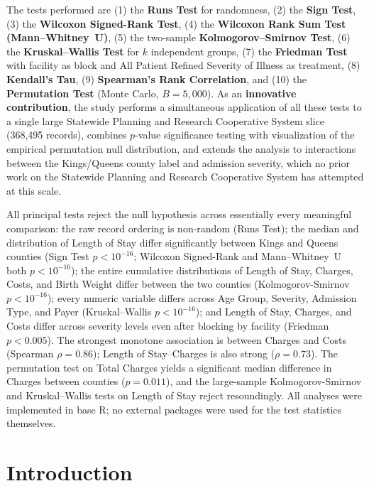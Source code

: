 \documentclass[12pt]{article}
\begin{document}
The tests performed are (1) the \textbf{Runs Test} for randomness,
(2) the \textbf{Sign Test}, (3) the \textbf{Wilcoxon Signed-Rank Test},
(4) the \textbf{Wilcoxon Rank Sum Test (Mann--Whitney~U)}, (5) the
two-sample \textbf{Kolmogorov--Smirnov Test}, (6) the
\textbf{Kruskal--Wallis Test} for $k$ independent groups, (7) the
\textbf{Friedman Test} with facility as block and All Patient Refined Severity of Illness
as treatment, (8) \textbf{Kendall's Tau}, (9) \textbf{Spearman's Rank
Correlation}, and (10) the \textbf{Permutation Test} (Monte Carlo,
$B=5{,}000$). As an \textbf{innovative contribution}, the study performs
a simultaneous application of all these tests to a single large Statewide Planning and Research Cooperative System
slice (368{,}495 records), combines $p$-value significance testing with
visualization of the empirical permutation null distribution, and extends
the analysis to interactions between the Kings/Queens county label and
admission severity, which no prior work on the Statewide Planning and Research Cooperative System has attempted at this
scale.

All principal tests reject the null hypothesis across essentially every
meaningful comparison: the raw record ordering is non-random (Runs Test);
the median and distribution of Length of Stay differ significantly
between Kings and Queens counties (Sign Test $p<10^{-16}$;
Wilcoxon Signed-Rank and Mann--Whitney~U both $p<10^{-16}$); the entire
cumulative distributions of Length of Stay, Charges, Costs, and Birth Weight differ
between the two counties (Kolmogorov-Smirnov $p<10^{-16}$); every numeric variable
differs across Age Group, Severity, Admission Type, and Payer
(Kruskal--Wallis $p<10^{-16}$); and Length of Stay, Charges, and Costs differ across
severity levels even after blocking by facility (Friedman $p<0.005$).
The strongest monotone association is between Charges and Costs
(Spearman $\rho=0.86$); Length of Stay--Charges is also strong ($\rho=0.73$).
The permutation test on Total Charges yields a significant median
difference in Charges between counties ($p=0.011$), and the
large-sample Kolmogorov-Smirnov and Kruskal--Wallis tests on Length
of Stay reject resoundingly. All analyses were implemented in base R;
no external packages were used for the test statistics themselves.

\section{Introduction}
\end{document}
